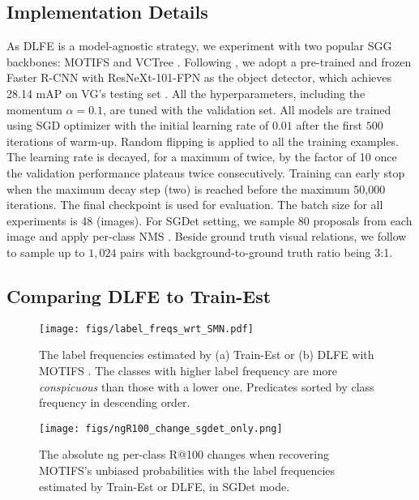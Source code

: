\documentclass[sigconf]{acmart}
\begin{document}
\subsection{Implementation Details}
\label{sec:impl_detail}
As DLFE is a model-agnostic strategy, we experiment with two popular SGG backbones: MOTIFS \cite{zellers2018neural} and VCTree \cite{tang2019learning}.
Following \cite{tang2020unbiased,DBLP:conf/bmvc/WangPL20}, we adopt a pre-trained and frozen Faster R-CNN \cite{ren2015faster} with ResNeXt-101-FPN \cite{lin2017feature} as the object detector, which achieves 28.14 mAP on VG's testing set \cite{tang2020unbiased}.
All the hyperparameters, including the momentum $\alpha=0.1$, are tuned with the validation set.
All models are trained using SGD optimizer with the initial learning rate of $0.01$ after the first $500$ iterations of warm-up.
Random flipping is applied to all the training examples.
The learning rate is decayed, for a maximum of twice, by the factor of 10 once the validation performance plateaus twice consecutively.
Training can early stop when the maximum decay step (two) is reached before the maximum 50,000 iterations.
The final checkpoint is used for evaluation.
The batch size for all experiments is 48 (images).
For SGDet setting, we sample 80 proposals from each image and apply per-class NMS \cite{rosenfeld1971edge}.
Beside ground truth visual relations, we follow \cite{tang2020unbiased} to sample up to $1,024$ pairs with background-to-ground truth ratio being 3:1.


\subsection{Comparing DLFE to Train-Est}
\label{sec:compare_dlfe_to_train_est}

\begin{figure}[t!]
\begin{center}
\texttt{[image: figs/label\_freqs\_wrt\_SMN.pdf]}
\end{center}
\vspace{-1.8em}
  \caption{
  The label frequencies estimated by (a) Train-Est or (b) DLFE with MOTIFS \cite{zellers2018neural}.
  The classes with higher label frequency are more \textit{conspicuous} than those with a lower one.
  Predicates sorted by class frequency in descending order.
}
\label{fig:compare_label_freq}
\vspace{-0.7em}
\end{figure}

\begin{figure}[t!]
\begin{center}
\texttt{[image: figs/ngR100\_change\_sgdet\_only.png]}
\end{center}
\vspace{-1.8em}
  \caption{
  The absolute ng per-class R@100 changes when recovering MOTIFS's \cite{zellers2018neural} unbiased probabilities with the label frequencies estimated by Train-Est or DLFE, in SGDet mode.
}
\label{fig:ngr_compairson}
\vspace{-1.5em}
\end{figure}
\end{document}
